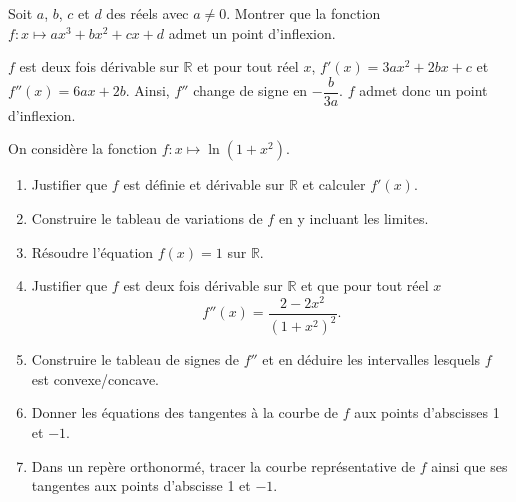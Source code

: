 \documentclass[11pt,fleqn, openany]{book} %
\begin{document}
\begin{exercise}Soit $a$, $b$, $c$ et $d$ des réels avec $a \neq 0$. Montrer que la fonction $f:x\mapsto ax^3+bx^2+cx+d$ admet un point d'inflexion.\end{exercise}

\begin{solution}$f$ est deux fois dérivable sur $\mathbb{R}$ et pour tout réel $x$, $f'(x)=3ax^2+2bx+c$ et $f''(x)=6ax+2b$. Ainsi, $f''$ change de signe en $-\dfrac{b}{3a}$. $f$ admet donc un point d'inflexion.\end{solution}



\begin{exercise}On considère la fonction $f:x\mapsto \ln(1+x^2)$.
\begin{enumerate}
\item Justifier que $f$ est définie et dérivable sur $\mathbb{R}$ et calculer $f'(x)$.
\item Construire le tableau de variations de $f$ en y incluant les limites.
\item Résoudre l'équation $f(x)=1$ sur $\mathbb{R}$.
\item Justifier que $f$ est deux fois dérivable sur $\mathbb{R}$ et que pour tout réel $x$
\[ f''(x)= \dfrac{2-2x^2}{(1+x^2)^2}.\]
\item Construire le tableau de signes de $f''$ et en déduire les intervalles lesquels $f$ est convexe/concave.
\item Donner les équations des tangentes à la courbe de $f$ aux points d'abscisses 1 et $-1$.
\item Dans un repère orthonormé, tracer la courbe représentative de $f$ ainsi que ses tangentes aux points d'abscisse 1 et $-1$.
\end{enumerate}\end{exercise}
\end{document}
